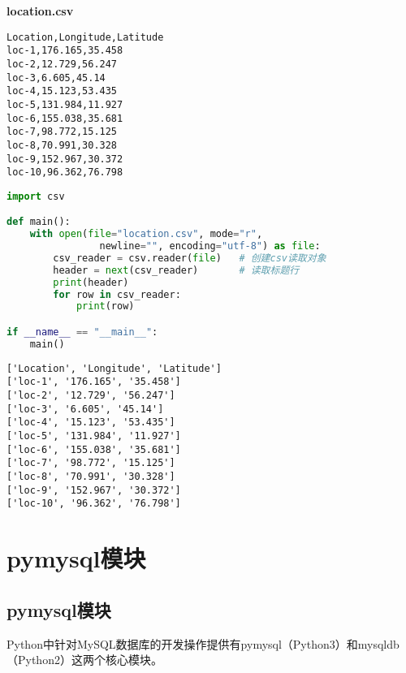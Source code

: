 \begin{tcolorbox}
	\textbf{location.csv}
	\begin{verbatim}
Location,Longitude,Latitude
loc-1,176.165,35.458
loc-2,12.729,56.247
loc-3,6.605,45.14
loc-4,15.123,53.435
loc-5,131.984,11.927
loc-6,155.038,35.681
loc-7,98.772,15.125
loc-8,70.991,30.328
loc-9,152.967,30.372
loc-10,96.362,76.798
\end{verbatim}
\end{tcolorbox}

\vspace{0.5cm}


\begin{lstlisting}[language=Python]
import csv

def main():
    with open(file="location.csv", mode="r", 
                newline="", encoding="utf-8") as file:
        csv_reader = csv.reader(file)   # 创建csv读取对象
        header = next(csv_reader)       # 读取标题行
        print(header)
        for row in csv_reader:
            print(row)

if __name__ == "__main__":
    main()
\end{lstlisting}

\begin{tcolorbox}
	\begin{verbatim}
['Location', 'Longitude', 'Latitude']
['loc-1', '176.165', '35.458']
['loc-2', '12.729', '56.247']
['loc-3', '6.605', '45.14']
['loc-4', '15.123', '53.435']
['loc-5', '131.984', '11.927']
['loc-6', '155.038', '35.681']
['loc-7', '98.772', '15.125']
['loc-8', '70.991', '30.328']
['loc-9', '152.967', '30.372']
['loc-10', '96.362', '76.798']
\end{verbatim}
\end{tcolorbox}

\newpage

\section{pymysql模块}

\subsection{pymysql模块}

Python中针对MySQL数据库的开发操作提供有pymysql（Python3）和mysqldb（Python2）这两个核心模块。\\


